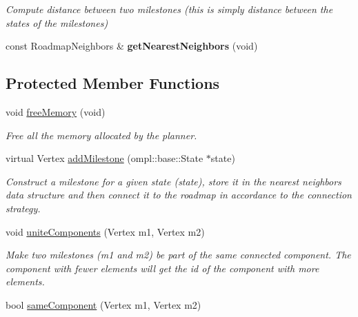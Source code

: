 \begin{DoxyCompactItemize}
\begin{DoxyCompactList}\small\item\em \-Compute distance between two milestones (this is simply distance between the states of the milestones) \end{DoxyCompactList}\item 
\hypertarget{class_f_i_r_m_ad6df82888d88ab8479f92f9f3e453c2e}{const \-Roadmap\-Neighbors \& {\bfseries get\-Nearest\-Neighbors} (void)}\label{class_f_i_r_m_ad6df82888d88ab8479f92f9f3e453c2e}

\end{DoxyCompactItemize}
\subsection*{\-Protected \-Member \-Functions}
\begin{DoxyCompactItemize}
\item 
\hypertarget{class_f_i_r_m_af6951ffec04529fd8da990978d7d8d19}{void \hyperlink{class_f_i_r_m_af6951ffec04529fd8da990978d7d8d19}{free\-Memory} (void)}\label{class_f_i_r_m_af6951ffec04529fd8da990978d7d8d19}

\begin{DoxyCompactList}\small\item\em \-Free all the memory allocated by the planner. \end{DoxyCompactList}\item 
virtual \-Vertex \hyperlink{class_f_i_r_m_a6b72ace6d1708b25bf8c7f69331ae82b}{add\-Milestone} (ompl\-::base\-::\-State $\ast$state)
\begin{DoxyCompactList}\small\item\em \-Construct a milestone for a given state ({\itshape state\/}), store it in the nearest neighbors data structure and then connect it to the roadmap in accordance to the connection strategy. \end{DoxyCompactList}\item 
\hypertarget{class_f_i_r_m_a34535f25e4f3fb645fb65d57e3faf01b}{void \hyperlink{class_f_i_r_m_a34535f25e4f3fb645fb65d57e3faf01b}{unite\-Components} (\-Vertex m1, \-Vertex m2)}\label{class_f_i_r_m_a34535f25e4f3fb645fb65d57e3faf01b}

\begin{DoxyCompactList}\small\item\em \-Make two milestones ({\itshape m1\/} and {\itshape m2\/}) be part of the same connected component. \-The component with fewer elements will get the id of the component with more elements. \end{DoxyCompactList}\item 
\hypertarget{class_f_i_r_m_a2045f113f0755ae8eeac2c35c7c08d41}{bool \hyperlink{class_f_i_r_m_a2045f113f0755ae8eeac2c35c7c08d41}{same\-Component} (\-Vertex m1, \-Vertex m2)}\label{class_f_i_r_m_a2045f113f0755ae8eeac2c35c7c08d41}


\end{DoxyCompactItemize}

